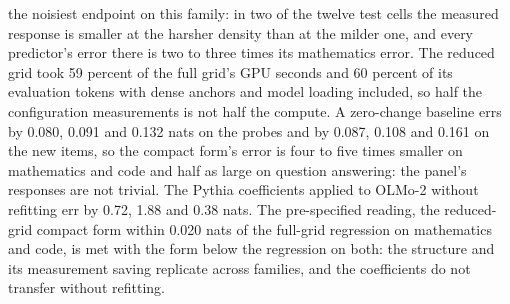 the noisiest endpoint on this family: in two of the twelve test cells the measured response is smaller
at the harsher density than at the milder one, and every predictor's error there is two to three
times its mathematics error. The reduced grid took 59 percent of the full grid's GPU seconds and 60
percent of its evaluation tokens with dense anchors and model loading included, so half the
configuration measurements is not half the compute. A zero-change baseline errs by 0.080, 0.091 and 0.132 nats on the probes and by 0.087, 0.108 and
0.161 on the new items, so the compact form's error is four to five times smaller on mathematics and
code and half as large on question answering: the panel's responses are not trivial. The Pythia
coefficients applied to OLMo-2 without refitting err by 0.72, 1.88 and 0.38 nats. The pre-specified reading, the reduced-grid compact form within
0.020 nats of the full-grid regression on mathematics and code, is met with the form below the
regression on both: the structure and its measurement saving replicate across families, and the
coefficients do not transfer without refitting.


